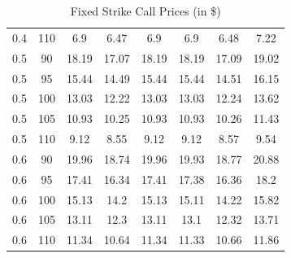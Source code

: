 \documentclass[12pt]{report}
\begin{document}
\begin{table}[H]
\begin{tabular}{|c|c|c|c|c|c|c|c|}
  0.4 & 110 & 6.9 & 6.47 & 6.9 & 6.9 & 6.48 & 7.22 \\
  0.5 & 90 & 18.19 & 17.07 & 18.19 & 18.19 & 17.09 & 19.02 \\
  0.5 & 95 & 15.44 & 14.49 & 15.44 & 15.44 & 14.51 & 16.15 \\
  0.5 & 100 & 13.03 & 12.22 & 13.03 & 13.03 & 12.24 & 13.62 \\
  0.5 & 105 & 10.93 & 10.25 & 10.93 & 10.93 & 10.26 & 11.43 \\
  0.5 & 110 & 9.12 & 8.55 & 9.12 & 9.12 & 8.57 & 9.54 \\
  0.6 & 90 & 19.96 & 18.74 & 19.96 & 19.93 & 18.77 & 20.88 \\
  0.6 & 95 & 17.41 & 16.34 & 17.41 & 17.38 & 16.36 & 18.2 \\
  0.6 & 100 & 15.13 & 14.2 & 15.13 & 15.11 & 14.22 & 15.82 \\
  0.6 & 105 & 13.11 & 12.3 & 13.11 & 13.1 & 12.32 & 13.71 \\
  0.6 & 110 & 11.34 & 10.64 & 11.34 & 11.33 & 10.66 & 11.86 \\
  \hline
  \end{tabular}
  \caption{Fixed Strike Call Prices (in \$)}
  \label{table:name}
\end{table}
\end{document}
